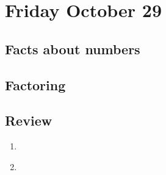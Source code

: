 \newpage
\section*{Friday October 29}
\subsection*{Facts about numbers}

\subsection*{Factoring}



\newpage




\newpage
\subsection*{Review}
\begin{enumerate}
    \item \hspace{1in}\\ 
    \item \hspace{1in}\\ 
\end{enumerate}


